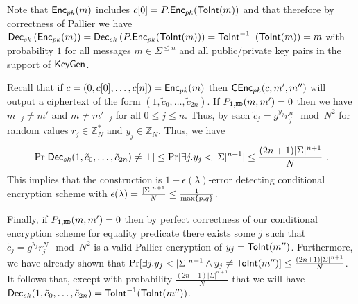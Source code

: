 \begin{remindertheorem} {}
\thmEDCorrect
\end{remindertheorem}

\begin{proofof}{}
Note that ${\mathsf{Enc}}_{pk}(m)$ includes $c[0] = P.{\mathsf{Enc}}_{pk}({\mathsf{ToInt}}(m))$ and that therefore by correctness of Pallier we have  ${\mathsf{Dec}}_{sk}\left( {\mathsf{Enc}}_{pk}(m)\right) = {\mathsf{Dec}}_{sk}\left( P.{\mathsf{Enc}}_{pk}({\mathsf{ToInt}}(m))\right) = {\mathsf{ToInt}^{-1}}$ $({\mathsf{ToInt}}(m)) = m$ with probability $1$ for all messages $m \in \Sigma^{\leq n}$ and all public/private key pairs in the support of ${\mathsf{KeyGen}}$. 

Recall that if $c = (0,c[0],\ldots, c[n])={\mathsf{Enc}}_{pk}(m)$ then ${\mathsf{C}}{\mathsf{Enc}}_{pk}(c,m',m'')$ will output a ciphertext of the form $(1,\tilde{c}_0,\ldots,\tilde{c}_{2n})$. If $P_{1,{\mathtt{ED}}}(m,m') = 0$ then we have $m_{-j} \neq m'$ and $m \neq m'_{-j}$ for all $0 \leq j \leq n$. Thus, by  each $\tilde{c}_j = g^{y_j} r_j^n \mod{N^2}$ for random values $r_j \in \mathbb{Z}_N^*$ and $y_j \in \mathbb{Z}_N$. Thus, we have \[\Pr[{\mathsf{Dec}}_{sk}(1,\tilde{c}_0,\ldots,\tilde{c}_{2n}) \neq \bot] \leq \Pr[\exists j. y_j < |\Sigma|^{n+1}] \leq \frac{(2n+1) |\Sigma|^{n+1}}{N} \ .\] This implies that the construction is $1-\epsilon(\lambda)$-error detecting conditional encryption scheme with $\epsilon(\lambda) = \frac{|\Sigma|^{n+1}}{N} \leq \frac{1}{\max\{p,q\}}$.

Finally, if $P_{1,{\mathtt{ED}}}(m,m') = 0$ then by perfect correctness of our conditional encryption scheme for equality predicate there exists some $j$ such that $\tilde{c}_j = g^{y_j} r_j^N \mod{N^2}$ is a valid Pallier encryption of  $y_j={\mathsf{ToInt}}(m'')$. Furthermore, we have already shown that $\Pr[\exists j. y_j < |\Sigma|^{n+1} \wedge y_j \neq {\ensuremath{\mathsf{ToInt}}}(m'')] \leq \frac{(2n+1) |\Sigma|^{n+1}}{N}$. It follows that, except with probability $\frac{(2n+1) |\Sigma|^{n+1}}{N}$ that we will have ${\mathsf{Dec}}_{sk}(1,\tilde{c}_0,\ldots,\tilde{c}_{2n}) = {\mathsf{ToInt}^{-1}}({\mathsf{ToInt}}(m''))$. 
    
\end{proofof}


